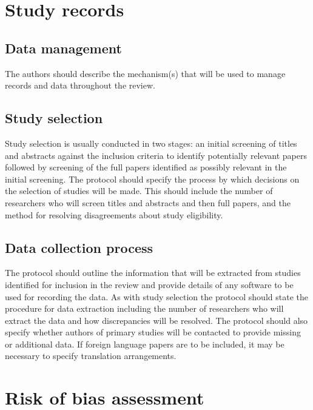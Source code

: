 \documentclass[
  10pt,
  a4paper,
  DIV=11,
  numbers=noendperiod]{scrreprt}
\begin{document}
\section{Study records}\label{study-records}

\subsection{Data management}\label{data-management}

The authors should describe the mechanism(s) that will be used to manage
records and data throughout the review.

\subsection{Study selection}\label{study-selection}

Study selection is usually conducted in two stages: an initial screening
of titles and abstracts against the inclusion criteria to identify
potentially relevant papers followed by screening of the full papers
identified as possibly relevant in the initial screening. The protocol
should specify the process by which decisions on the selection of
studies will be made. This should include the number of researchers who
will screen titles and abstracts and then full papers, and the method
for resolving disagreements about study eligibility.

\subsection{Data collection process}\label{data-collection-process}

The protocol should outline the information that will be extracted from
studies identified for inclusion in the review and provide details of
any software to be used for recording the data. As with study selection
the protocol should state the procedure for data extraction including
the number of researchers who will extract the data and how
discrepancies will be resolved. The protocol should also specify whether
authors of primary studies will be contacted to provide missing or
additional data. If foreign language papers are to be included, it may
be necessary to specify translation arrangements.

\section{Risk of bias assessment}\label{risk-of-bias-assessment}
\end{document}
